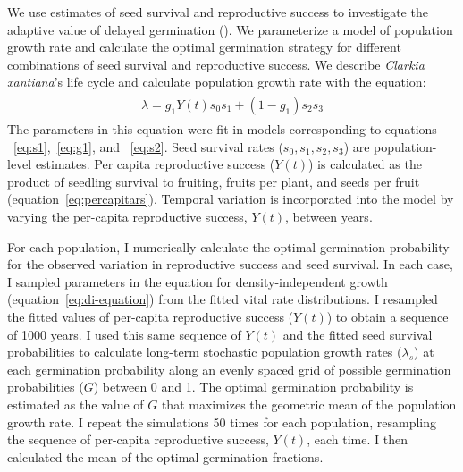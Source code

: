 \documentclass[12pt, oneside, titlepage]{article}   	%
\begin{document}
We use estimates of seed survival and reproductive success to investigate the adaptive value of delayed germination (\cite{gremer2014}). We parameterize a model of population growth rate and calculate the optimal germination strategy for different combinations of seed survival and reproductive success. We describe \textit{Clarkia xantiana}'s life cycle and calculate population growth rate with the equation:
%
\begin{align}
  \begin{split}
\lambda = g_1 Y(t) s_0 s_1  + (1-g_1) s_2 s_3  \label{eq:di-equation}
  \end{split}
\end{align}
%
The parameters in this equation were fit in models corresponding to equations ~\eqref{eq:s1},~\eqref{eq:g1}, and ~\eqref{eq:s2}. Seed survival rates ($s_0, s_1, s_2, s_3$) are population-level estimates. Per capita reproductive success ($Y(t)$) is calculated as the product of seedling survival to fruiting, fruits per plant, and seeds per fruit (equation~\eqref{eq:percapitars}). Temporal variation is incorporated into the model by varying the per-capita reproductive success, $Y(t)$, between years.

For each population, I numerically calculate the optimal germination probability for the observed variation in reproductive success and seed survival. In each case, I sampled parameters in the equation for density-independent growth (equation~\eqref{eq:di-equation}) from the fitted vital rate distributions. I resampled the fitted values of per-capita reproductive success ($Y(t)$) to obtain a sequence of 1000 years. I used this same sequence of $Y(t)$ and the fitted seed survival probabilities to calculate long-term stochastic population growth rates ($\lambda_s$) at each germination probability along an evenly spaced grid of possible germination probabilities ($G$) between 0 and 1. The optimal germination probability is estimated as the value of $G$ that maximizes the geometric mean of the population growth rate. I repeat the simulations 50 times for each population, resampling the sequence of per-capita reproductive success, $Y(t)$, each time. I then calculated the mean of the optimal germination fractions.  

\end{document}

